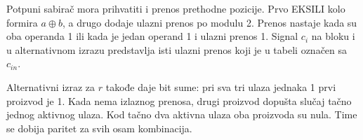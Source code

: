 Potpuni sabirač mora prihvatiti i prenos prethodne pozicije. Prvo EKSILI kolo formira $a\oplus b$, a drugo dodaje ulazni prenos po modulu 2. Prenos nastaje kada su oba operanda 1 ili kada je jedan operand 1 i ulazni prenos 1. Signal $c_i$ na bloku i u alternativnom izrazu predstavlja isti ulazni prenos koji je u tabeli označen sa $c_{in}$.

Alternativni izraz za $r$ takođe daje bit sume: pri sva tri ulaza jednaka 1 prvi proizvod je 1. Kada nema izlaznog prenosa, drugi proizvod dopušta slučaj tačno jednog aktivnog ulaza. Kod tačno dva aktivna ulaza oba proizvoda su nula. Time se dobija paritet za svih osam kombinacija.
